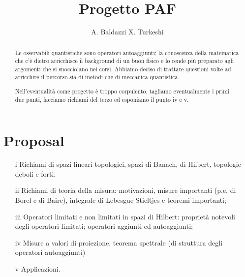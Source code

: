 \documentclass[a4paper,11pt]{article}
\title{Progetto PAF}
\author{A. Baldazzi X. Turkeshi}
\begin{document}
\maketitle

\section*{Proposal}

\begin{abstract} Le osservabili quantistiche sono operatori autoaggiunti; la conoscenza della matematica che c'è dietro
arricchisce il background di un buon fisico e lo rende più preparato agli argomenti che si snocciolano nei corsi. Abbiamo deciso
di trattare questioni volte ad arricchire il percorso sia di metodi che di meccanica quantistica.

Nell'eventualità come progetto è troppo corpulento, tagliamo eventualmente i primi due punti, facciamo richiami del terzo ed esponiamo il punto iv e v.
\end{abstract}


\begin{itemize}
\item[i]  Richiami di spazi lineari topologici, spazi di Banach, di Hilbert, topologie deboli e forti;
\item[ii] Richiami di teoria della misura: motivazioni, misure importanti (p.e. di Borel e di Baire), integrale di Lebesgue-Stieltjes e teoremi importanti;
\item[iii] Operatori limitati e non limitati in spazi di Hilbert: proprietà notevoli degli operatori limitati; operatori aggiunti ed autoaggiunti;
\item[iv] Misure a valori di proiezione, teorema spettrale (di struttura degli operatori autoaggiunti)
\item[v] Applicazioni.
\end{itemize}
\end{document}
